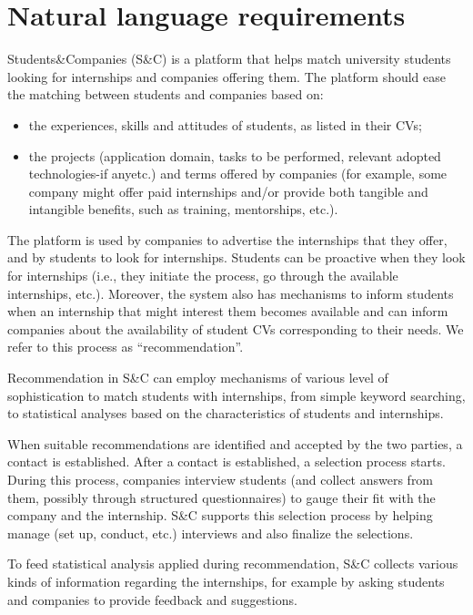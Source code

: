 \section{Natural language requirements}

Students\&Companies (S\&C) is a platform that helps match university students looking for internships and companies offering them. The platform should ease the matching between students and companies based on:
\begin{itemize}
    \item the experiences, skills and attitudes of students, as listed in their CVs;
    \item the projects (application domain, tasks to be performed, relevant adopted technologies-if anyetc.) and terms offered by companies (for example, some company might offer paid internships and/or provide both tangible and intangible benefits, such as training, mentorships, etc.).
\end{itemize}

The platform is used by companies to advertise the internships that they offer, and by students to look for internships. Students can be proactive when they look for internships (i.e., they initiate the process, go through the available internships, etc.). Moreover, the system also has mechanisms to inform students when an internship that might interest them becomes available and can inform companies about the availability of student CVs corresponding to their needs. We refer to this process as “recommendation”.

Recommendation in S\&C can employ mechanisms of various level of sophistication to match students with internships, from simple keyword searching, to statistical analyses based on the characteristics of
students and internships.

When suitable recommendations are identified and accepted by the two parties, a contact is established. After a contact is established, a selection process starts. During this process, companies interview students (and collect answers from them, possibly through structured questionnaires) to gauge their fit with the company and the internship. S\&C supports this selection process by helping
manage (set up, conduct, etc.) interviews and also finalize the selections.

To feed statistical analysis applied during recommendation, S\&C collects various kinds of information regarding the internships, for example by asking students and companies to provide feedback and suggestions.

